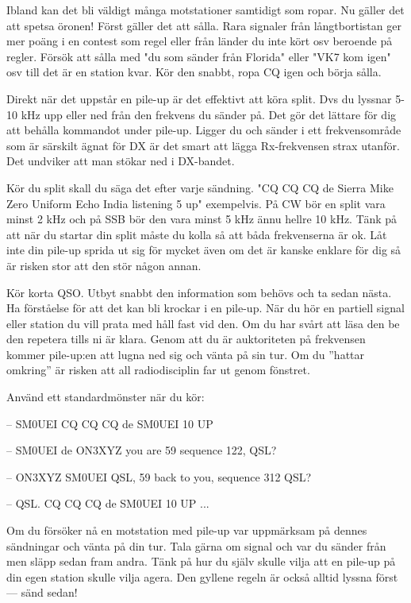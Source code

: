 Ibland kan det bli väldigt många motstationer samtidigt som ropar. Nu gäller det att spetsa öronen! Först gäller det att sålla. Rara signaler från långtbortistan ger mer poäng i en contest som regel eller från länder du inte kört osv beroende på regler. Försök att sålla med "du som sänder från Florida" eller "VK7 kom igen" osv till det är en station kvar. Kör den snabbt, ropa CQ igen och börja sålla.

Direkt när det uppstår en pile-up är det effektivt att köra split. Dvs du lyssnar 5-10 kHz upp eller ned från den frekvens du sänder på. Det gör det lättare för dig att behålla kommandot under pile-up. Ligger du och sänder i ett frekvensområde som är särskilt ägnat för DX är det smart att lägga Rx-frekvensen strax utanför. Det undviker att man stökar ned i DX-bandet.

Kör du split skall du säga det efter varje sändning. "CQ CQ CQ de Sierra Mike Zero Uniform Echo India listening 5 up" exempelvis. På CW bör en split vara minst 2 kHz och på SSB bör den vara minst 5 kHz ännu hellre 10 kHz. Tänk på att när du startar din split måste du kolla så att båda frekvenserna är ok. Låt inte din pile-up sprida ut sig för mycket även om det är kanske enklare för dig så är risken stor att den stör någon annan. 

Kör korta QSO. Utbyt snabbt den information som behövs och ta sedan nästa. Ha förståelse för att det kan bli krockar i en pile-up. När du hör en partiell signal eller station du vill prata med håll fast vid den. Om du har svårt att läsa den be den repetera tills ni är klara. Genom att du är auktoriteten på frekvensen kommer pile-up:en att lugna ned sig och vänta på sin tur. Om du ''hattar omkring'' är risken att all radiodisciplin far ut genom fönstret.

Använd ett standardmönster när du kör:

-- SM0UEI CQ CQ CQ de SM0UEI 10 UP

-- SM0UEI de ON3XYZ you are 59 sequence 122, QSL?

-- ON3XYZ SM0UEI QSL, 59 back to you, sequence 312 QSL?

-- QSL. CQ CQ CQ de SM0UEI 10 UP ...

Om du försöker nå en motstation med pile-up var uppmärksam på dennes sändningar och vänta på din tur. Tala gärna om signal och var du sänder från men släpp sedan fram andra. Tänk på hur du själv skulle vilja att en pile-up på din egen station skulle vilja agera. Den gyllene regeln är också alltid lyssna först --- sänd sedan!
